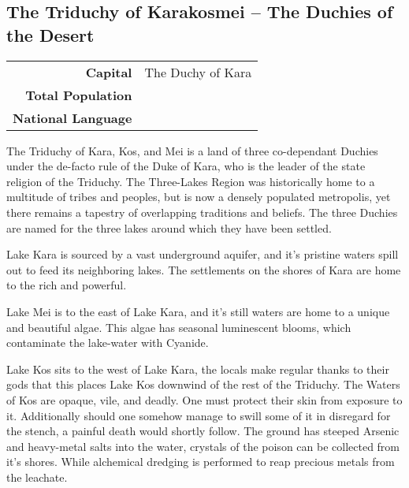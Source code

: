 \subsection{The Triduchy of Karakosmei -- The Duchies of the Desert}
\begin{tabular}{r | l}
    \textbf{Capital} & The Duchy of Kara\\
    \textbf{Total Population} & \\
    \textbf{National Language} & 
\end{tabular}

The Triduchy of Kara, Kos, and Mei is a land of three co-dependant Duchies under the de-facto rule of the Duke of Kara, who is the leader of the state religion of the Triduchy. 
The Three-Lakes Region was historically home to a multitude of tribes and peoples, but is now a densely populated metropolis, yet there remains a tapestry of overlapping traditions and beliefs. 
The three Duchies are named for the three lakes around which they have been settled.

Lake Kara is sourced by a vast underground aquifer, and it’s pristine waters spill out to feed its neighboring lakes. 
The settlements on the shores of Kara are home to the rich and powerful.

Lake Mei is to the east of Lake Kara, and it’s still waters are home to a unique and beautiful algae. 
This algae has seasonal luminescent blooms, which contaminate the lake-water with Cyanide.

Lake Kos sits to the west of Lake Kara, the locals make regular thanks to their gods that this places Lake Kos downwind of the rest of the Triduchy. 
The Waters of Kos are opaque, vile, and deadly. 
One must protect their skin from exposure to it. 
Additionally should one somehow manage to swill some of it in disregard for the stench, a painful death would shortly follow. 
The ground has steeped Arsenic and heavy-metal salts into the water, crystals of the poison can be collected from it’s shores. 
While alchemical dredging is performed to reap precious metals from the leachate.


